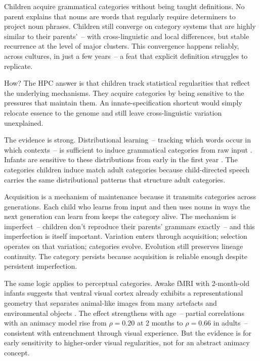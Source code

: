 Children acquire grammatical categories without being taught definitions. No parent explains that nouns are words that regularly require determiners to project noun phrases. Children still converge on category systems that are highly similar to their parents'~-- with cross-linguistic and local differences, but stable recurrence at the level of major clusters. This convergence happens reliably, across cultures, in just a few years~-- a feat that explicit definition struggles to replicate.

How? The HPC answer is that children track statistical regularities that reflect the underlying mechanisms. They acquire categories by being sensitive to the pressures that maintain them. An innate-specification shortcut would simply relocate essence to the genome and still leave cross-linguistic variation unexplained.

The evidence is strong. Distributional learning~-- tracking which words occur in which contexts~-- is sufficient to induce grammatical categories from raw input \citep{redington1998,mintz2003,piantadosi2024,kallini2024}. Infants are sensitive to these distributions from early in the first year \citep{gomez2000}. The categories children induce match adult categories because child-directed speech carries the same distributional patterns that structure adult categories.

Acquisition is a mechanism of maintenance because it transmits categories across generations. Each child who learns  from input and then uses nouns in ways the next generation can learn from keeps the category alive. The mechanism is imperfect~-- children don't reproduce their parents' grammars exactly~-- and this imperfection is itself important. Variation enters through acquisition; selection operates on that variation; categories evolve. Evolution still preserves lineage continuity. The category persists because acquisition is reliable enough despite persistent imperfection.

The same logic applies to perceptual categories. Awake fMRI with 2-month-old infants suggests that ventral visual cortex already exhibits a representational geometry that separates animal-like images from many artefacts and environmental objects \parencite{odoherty2025}. The effect strengthens with age~-- partial correlations with an animacy model rise from $\rho = 0.20$ at 2 months to $\rho = 0.66$ in adults~-- consistent with entrenchment through visual experience. But the evidence is for early sensitivity to higher-order visual regularities, not for an abstract animacy concept.


